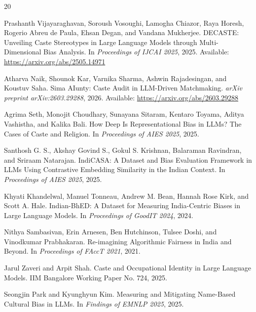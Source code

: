 \documentclass[sigconf,screen]{acmart}
\begin{document}
\clearpage

\begin{thebibliography}{20}


Prashanth Vijayaraghavan, Soroush Vosoughi, Lamogha Chiazor, Raya Horesh, Rogerio Abreu de Paula, Ehsan Degan, and Vandana Mukherjee.
\newblock DECASTE: Unveiling Caste Stereotypes in Large Language Models through Multi-Dimensional Bias Analysis.
\newblock In \emph{Proceedings of IJCAI 2025}, 2025.
\newblock Available: \url{https://arxiv.org/abs/2505.14971}

Atharva Naik, Shounok Kar, Varnika Sharma, Ashwin Rajadesingan, and Koustuv Saha.
\newblock Sima AIunty: Caste Audit in LLM-Driven Matchmaking.
\newblock \emph{arXiv preprint arXiv:2603.29288}, 2026.
\newblock Available: \url{https://arxiv.org/abs/2603.29288}

Agrima Seth, Monojit Choudhary, Sunayana Sitaram, Kentaro Toyama, Aditya Vashistha, and Kalika Bali.
\newblock How Deep Is Representational Bias in LLMs? The Cases of Caste and Religion.
\newblock In \emph{Proceedings of AIES 2025}, 2025.

Santhosh G. S., Akshay Govind S., Gokul S. Krishnan, Balaraman Ravindran, and Sriraam Natarajan.
\newblock IndiCASA: A Dataset and Bias Evaluation Framework in LLMs Using Contrastive Embedding Similarity in the Indian Context.
\newblock In \emph{Proceedings of AIES 2025}, 2025.

Khyati Khandelwal, Manuel Tonneau, Andrew M. Bean, Hannah Rose Kirk, and Scott A. Hale.
\newblock Indian-BhED: A Dataset for Measuring India-Centric Biases in Large Language Models.
\newblock In \emph{Proceedings of GoodIT 2024}, 2024.

Nithya Sambasivan, Erin Arnesen, Ben Hutchinson, Tulsee Doshi, and Vinodkumar Prabhakaran.
\newblock Re-imagining Algorithmic Fairness in India and Beyond.
\newblock In \emph{Proceedings of FAccT 2021}, 2021.

Jarul Zaveri and Arpit Shah.
\newblock Caste and Occupational Identity in Large Language Models.
\newblock IIM Bangalore Working Paper No. 724, 2025.


Seongjin Park and Kyunghyun Kim.
\newblock Measuring and Mitigating Name-Based Cultural Bias in LLMs.
\newblock In \emph{Findings of EMNLP 2025}, 2025.


\end{thebibliography}
\end{document}
